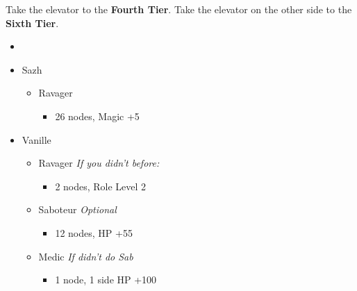 \begin{multicols}{2}
  Take the elevator to the \textbf{Fourth Tier}.
  Take the elevator on the other side to the \textbf{Sixth Tier}.
  \begin{menu}
    \begin{itemize}
      \paradigm
      \begin{itemize}
        \item {}%
              {\paradigmline[1]{\textit{\syn}}{\textit{\sab}}{\textit{\rav}}}%
              {\paradigmline{\com}{\rav}{\rav}}%
              {\paradigmline{\syn}{\med}{\com}}%
              {\paradigmline{\com}{\med}{\com}}%
              {\paradigmline{(\rav)}{\sab}{(\rav)}}%
              {\paradigmline{\com}{\rav}{\com}}
      \end{itemize}
      \crystarium
      \begin{itemize}
        \item Sazh
              \begin{itemize}
                \item Ravager
                      \begin{itemize}
                        \item 26 nodes, Magic +5
                      \end{itemize}
              \end{itemize}
        \item Vanille
              \begin{itemize}
                \item Ravager  \textit{If you didn't before:}
                      \begin{itemize}
                        \item 2 nodes, Role Level 2
                      \end{itemize}
                \item Saboteur \textit{Optional}
                      \begin{itemize}
                        \item 12 nodes, HP +55
                      \end{itemize}
                \item Medic \textit{If didn't do Sab}
                      \begin{itemize}
                        \item 1 node, 1 side HP +100
                      \end{itemize}

\end{itemize}
\end{itemize}
\end{itemize}
\end{menu}
\end{multicols}
